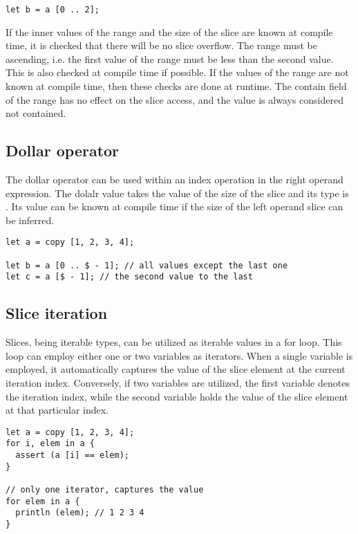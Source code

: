 \begin{itemize}
\begin{lstlisting}[style=coloredverbatim]
let b = a [0 .. 2];
  \end{lstlisting}

  If the inner values of the range and the size of the slice are known at
  compile time, it is checked that there will be no slice overflow. The range
  must be ascending, i.e. the first value of the range must be less than the
  second value. This is also checked at compile time if possible. If the values
  of the range are not known at compile time, then these checks are done at
  runtime. The contain field of the range has no effect on the slice access, and
  the  value is always considered not contained.

\end{itemize}


\subsection{Dollar operator}

The dollar operator can be used within an index operation in the right operand
expression. The dolalr value takes the value of the size of the slice and its
type is . Its value can be known at compile time if the size of
the left operand slice can be inferred.

\begin{lstlisting}[style=coloredverbatim]
let a = copy [1, 2, 3, 4];

let b = a [0 .. $ - 1]; // all values except the last one
let c = a [$ - 1]; // the second value to the last
\end{lstlisting}


\subsection{Slice iteration}

Slices, being iterable types, can be utilized as iterable values in a for loop.
This loop can employ either one or two variables as iterators. When a single
variable is employed, it automatically captures the value of the slice element
at the current iteration index. Conversely, if two variables are utilized, the
first variable denotes the iteration index, while the second variable holds the
value of the slice element at that particular index.

\begin{lstlisting}[style=coloredverbatim]
let a = copy [1, 2, 3, 4];
for i, elem in a {
  assert (a [i] == elem);
}

// only one iterator, captures the value
for elem in a {
  println (elem); // 1 2 3 4
}
\end{lstlisting}

